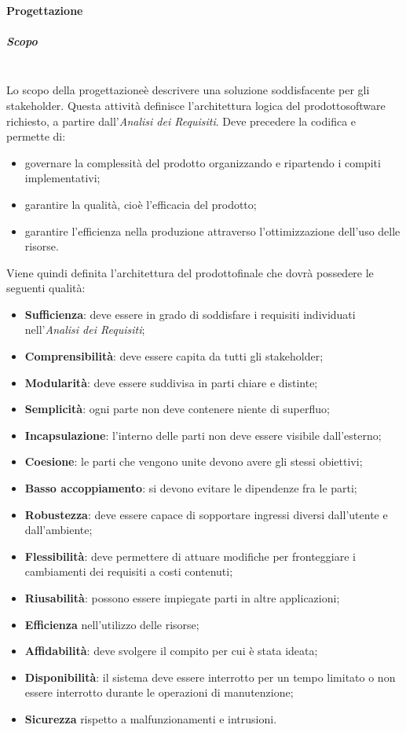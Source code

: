 		\paragraph{Progettazione}
\subparagraph*{Scopo}\mbox{}\\ [1mm]
Lo scopo della progettazione\glosp è descrivere una soluzione soddisfacente per gli stakeholder\glo. Questa attività definisce l'architettura logica del prodotto\glosp software richiesto, a partire dall'\textit{Analisi dei Requisiti}. 
Deve precedere la codifica e permette di: 
\begin{itemize}
	\item governare la complessità del prodotto organizzando e ripartendo i compiti implementativi;
	\item garantire la qualità, cioè l'efficacia del prodotto;
	\item garantire l'efficienza nella produzione attraverso l'ottimizzazione dell'uso delle risorse.
\end{itemize}
Viene quindi definita l'architettura del prodotto\glosp finale che dovrà possedere le seguenti qualità:
\begin{itemize}
	\item \textbf{Sufficienza}: deve essere in grado di soddisfare i requisiti individuati nell'\textit{Analisi dei Requisiti};
	\item \textbf{Comprensibilità}: deve essere capita da tutti gli stakeholder\glo;
	\item \textbf{Modularità}: deve essere suddivisa in parti chiare e distinte;
	\item \textbf{Semplicità}: ogni parte non deve contenere niente di superfluo;
	\item \textbf{Incapsulazione}: l'interno delle parti non deve essere visibile dall'esterno;
	\item \textbf{Coesione}: le parti che vengono unite devono avere gli stessi obiettivi;
	\item \textbf{Basso accoppiamento}: si devono evitare le dipendenze fra le parti;
	\item \textbf{Robustezza}: deve essere capace di sopportare ingressi diversi dall'utente e dall'ambiente;
	\item \textbf{Flessibilità}: deve permettere di attuare modifiche per fronteggiare i cambiamenti dei requisiti a costi contenuti; 
	\item \textbf{Riusabilità}: possono essere impiegate parti in altre applicazioni;
	\item \textbf{Efficienza} nell'utilizzo delle risorse;
	\item \textbf{Affidabilità}: deve svolgere il compito per cui è stata ideata;
	\item \textbf{Disponibilità}: il sistema deve essere interrotto per un tempo limitato o non essere interrotto durante le operazioni di manutenzione;
	\item \textbf{Sicurezza} rispetto a malfunzionamenti e intrusioni.	
\end{itemize}
